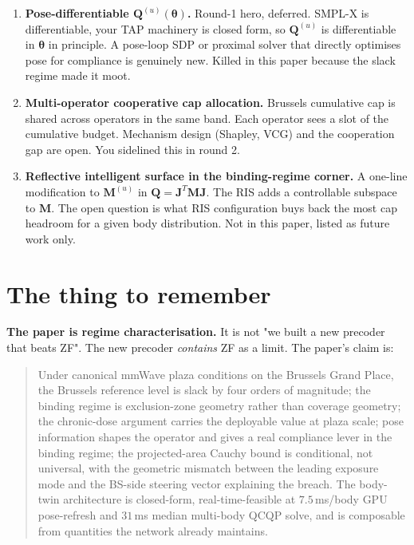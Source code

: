 \documentclass[11pt]{article}
\newcommand{\Qmat}{\mathbf{Q}}
\newcommand{\Mmat}{\mathbf{M}}
\newcommand{\Jmat}{\mathbf{J}}
\begin{document}
\begin{enumerate}[leftmargin=1.6em,itemsep=2pt]
  \item \textbf{Pose-differentiable $\Qmat^{(u)}(\bm\theta)$.} Round-1
  hero, deferred. SMPL-X is differentiable, your TAP machinery is
  closed form, so $\Qmat^{(u)}$ is differentiable in $\bm\theta$ in
  principle. A pose-loop SDP or proximal solver that directly
  optimises pose for compliance is genuinely new. Killed in this paper
  because the slack regime made it moot.

  \item \textbf{Multi-operator cooperative cap allocation.} Brussels
  cumulative cap is shared across operators in the same band. Each
  operator sees a slot of the cumulative budget. Mechanism design
  (Shapley, VCG) and the cooperation gap are open. You sidelined this
  in round 2.

  \item \textbf{Reflective intelligent surface in the binding-regime
  corner.} A one-line modification to $\Mmat^{(u)}$ in
  $\Qmat = \Jmat^T \Mmat \Jmat$. The RIS adds a controllable subspace
  to $\Mmat$. The open question is what RIS configuration buys back
  the most cap headroom for a given body distribution. Not in this
  paper, listed as future work only.
\end{enumerate}

\section{The thing to remember}

\textbf{The paper is regime characterisation.} It is not "we built a
new precoder that beats ZF". The new precoder \emph{contains} ZF as a
limit. The paper's claim is:

\begin{quote}
Under canonical mmWave plaza conditions on the Brussels Grand Place,
the Brussels reference level is slack by four orders of magnitude;
the binding regime is exclusion-zone geometry rather than coverage
geometry; the chronic-dose argument carries the deployable value at
plaza scale; pose information shapes the operator and gives a real
compliance lever in the binding regime; the projected-area Cauchy
bound is conditional, not universal, with the geometric mismatch
between the leading exposure mode and the BS-side steering vector
explaining the breach. The body-twin architecture is closed-form,
real-time-feasible at $7.5\,$ms/body GPU pose-refresh and $31\,$ms
median multi-body QCQP solve, and is composable from quantities the
network already maintains.
\end{quote}
\end{document}

